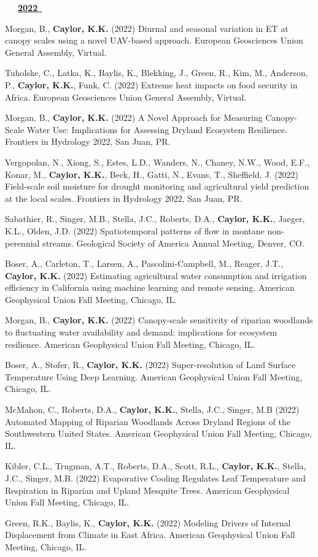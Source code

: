 \begin{etaremune}
\vspace{0.1in}
\mbox{\ \ \ \underline{\textbf{2022 }}}
\vspace{0.1in}

\item Morgan, B., \textbf{ Caylor, K.K.} (2022) Diurnal and seasonal variation in ET at canopy scales using a novel UAV-based approach. European Geosciences Union General Assembly, Virtual.
\item Tuholske, C., Latka, K., Baylis, K., Blekking, J., Green, R., Kim, M., Anderson, P., \textbf{ Caylor, K.K.}, Funk, C. (2022) Extreme heat impacts on food security in Africa. European Geosciences Union General Assembly, Virtual.
\item Morgan, B., \textbf{ Caylor, K.K.} (2022) A Novel Approach for Measuring Canopy-Scale Water Use: Implications for Assessing Dryland Ecosystem Resilience. Frontiers in Hydrology 2022, San Juan, PR.
\item Vergopolan, N., Xiong, S., Estes, L.D., Wanders, N., Chaney, N.W., Wood, E.F., Konar, M., \textbf{ Caylor, K.K.}, Beck, H., Gatti, N., Evans, T., Sheffield, J. (2022) Field-scale soil moisture for drought monitoring and agricultural yield prediction at the local scales. Frontiers in Hydrology 2022, San Juan, PR.
\item Sabathier, R., Singer, M.B., Stella, J.C., Roberts, D.A., \textbf{ Caylor, K.K.}, Jaeger, K.L., Olden, J.D. (2022) Spatiotemporal patterns of flow in montane non-perennial streams. Geological Society of America Annual Meeting, Denver, CO.
\item Boser, A., Carleton, T., Larsen, A., Pascolini-Campbell, M., Reager, J.T., \textbf{ Caylor, K.K.} (2022) Estimating agricultural water consumption and irrigation efficiency in California using machine learning and remote sensing. American Geophysical Union Fall Meeting, Chicago, IL.
\item Morgan, B., \textbf{ Caylor, K.K.} (2022) Canopy-scale sensitivity of riparian woodlands to fluctuating water availability and demand: implications for ecosystem resilience. American Geophysical Union Fall Meeting, Chicago, IL.
\item Boser, A., Stofer, R., \textbf{ Caylor, K.K.} (2022) Super-resolution of Land Surface Temperature Using Deep Learning. American Geophysical Union Fall Meeting, Chicago, IL.
\item McMahon, C., Roberts, D.A., \textbf{ Caylor, K.K.}, Stella, J.C., Singer, M.B (2022) Automated Mapping of Riparian Woodlands Across Dryland Regions of the Southwestern United States. American Geophysical Union Fall Meeting, Chicago, IL.
\item Kibler, C.L., Trugman, A.T., Roberts, D.A., Scott, R.L., \textbf{ Caylor, K.K.}, Stella, J.C., Singer, M.B. (2022) Evaporative Cooling Regulates Leaf Temperature and Respiration in Riparian and Upland Mesquite Trees. American Geophysical Union Fall Meeting, Chicago, IL.
\item Green, R.K., Baylis, K., \textbf{ Caylor, K.K.} (2022) Modeling Drivers of Internal Displacement from Climate in East Africa. American Geophysical Union Fall Meeting, Chicago, IL.


\end{etaremune}
